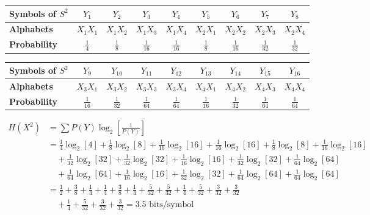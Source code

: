 \documentclass[12pt]{article}
\begin{document}
\begin{table}[ht]
	\centering
	\renewcommand{\arraystretch}{1.5}
	\begin{tabular}{|l|c|c|c|c|c|c|c|c|}
		\hline
		\cellcolor{black!10}\textbf{Symbols of $S^2$} & $Y_1$         & $Y_2$         & $Y_3$          & $Y_4$          & $Y_5$         & $Y_6$          & $Y_7$          & $Y_8$          \\ \hline
		\cellcolor{black!10}\textbf{Alphabets}        & $X_1X_1$      & $X_1X_2$      & $X_1X_3$       & $X_1X_4$       & $X_2X_1$      & $X_2X_2$       & $X_2X_3$       & $X_2X_4$       \\ \hline
		\cellcolor{black!10}\textbf{Probability}      & $\frac{1}{4}$ & $\frac{1}{8}$ & $\frac{1}{16}$ & $\frac{1}{16}$ & $\frac{1}{8}$ & $\frac{1}{16}$ & $\frac{1}{32}$ & $\frac{1}{32}$ \\ \hline
	\end{tabular}%
	\vspace{0.2cm}

	\begin{tabular}{|l|c|c|c|c|c|c|c|c|}
		\hline
		\cellcolor{black!10}\textbf{Symbols of $S^2$} & $Y_9$          & $Y_{10}$       & $Y_{11}$       & $Y_{12}$       & $Y_{13}$       & $Y_{14}$       & $Y_{15}$       & $Y_{16}$       \\ \hline
		\cellcolor{black!10}\textbf{Alphabets}        & $X_3X_1$       & $X_3X_2$       & $X_3X_3$       & $X_3X_4$       & $X_4X_1$       & $X_4X_2$       & $X_4X_3$       & $X_4X_4$       \\ \hline
		\cellcolor{black!10}\textbf{Probability}      & $\frac{1}{16}$ & $\frac{1}{32}$ & $\frac{1}{64}$ & $\frac{1}{64}$ & $\frac{1}{16}$ & $\frac{1}{32}$ & $\frac{1}{64}$ & $\frac{1}{64}$ \\ \hline
	\end{tabular}%
\end{table}

\begin{align*}
	H(X^2) & = \sum P(Y) \log_2 \left[ \frac{1}{P(Y)} \right]                                                                                                                             \\
	       & = \frac{1}{4}\log_2[4] + \frac{1}{8}\log_2[8] + \frac{1}{16}\log_2[16] + \frac{1}{16}\log_2[16] + \frac{1}{8}\log_2[8] + \frac{1}{16}\log_2[16]                              \\
	       & \quad + \frac{1}{32}\log_2[32] + \frac{1}{32}\log_2[32] + \frac{1}{16}\log_2[16] + \frac{1}{32}\log_2[32] + \frac{1}{64}\log_2[64]                                           \\
	       & \quad + \frac{1}{64}\log_2[64] + \frac{1}{16}\log_2[16] + \frac{1}{32}\log_2[32] + \frac{1}{64}\log_2[64] + \frac{1}{64}\log_2[64]                                           \\
	       & = \frac{1}{2} + \frac{3}{8} + \frac{1}{4} + \frac{1}{4} + \frac{3}{8} + \frac{1}{4} + \frac{5}{32} + \frac{5}{32} + \frac{1}{4} + \frac{5}{32} + \frac{3}{32} + \frac{3}{32} \\
	       & \quad + \frac{1}{4} + \frac{5}{32} + \frac{3}{32} + \frac{3}{32} = 3.5 \text{ bits/symbol}
\end{align*}
\end{document}
